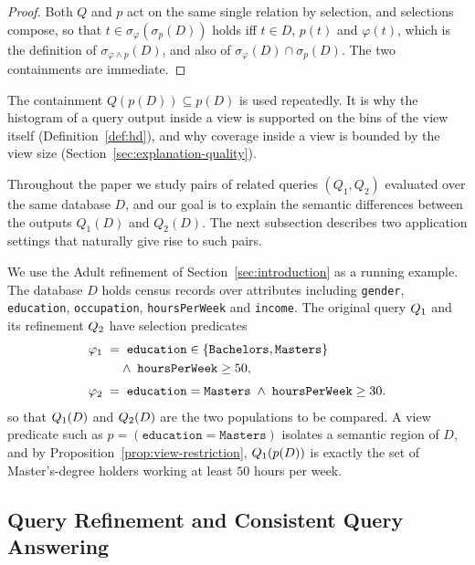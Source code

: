 \begin{proof}
Both $Q$ and $p$ act on the same single relation by selection, and selections
compose, so that $t\in\sigma_\varphi(\sigma_p(D))$ holds iff $t\in D$, $p(t)$ and $\varphi(t)$,
which is the definition of $\sigma_{\varphi\wedge p}(D)$, and also of
$\sigma_\varphi(D)\cap\sigma_p(D)$.
The two containments are immediate.
\end{proof}

The containment $Q(p(D))\subseteq p(D)$ is used repeatedly.
It is why the histogram
of a query output inside a view is supported on the bins of the view itself
(Definition~\ref{def:hd}), and why coverage inside a view is bounded by the view
size (Section~\ref{sec:explanation-quality}).

Throughout the paper we study pairs of related queries $(Q_1,Q_2)$ evaluated over
the same database $D$, and our goal is to explain the semantic differences between
the outputs $Q_1(D)$ and $Q_2(D)$.
The next subsection describes two application settings that naturally give rise to
such pairs.

\begin{example}
\label{ex:running}
We use the Adult refinement of Section~\ref{sec:introduction} as a running example.
The database $D$ holds census records over attributes including
\texttt{gender}, \texttt{education}, \texttt{occupation}, \texttt{hoursPerWeek} and
\texttt{income}.
The original query $Q_1$ and its refinement $Q_2$ have selection
predicates
\begin{align*}
\varphi_1 &\;=\; \texttt{education} \in \{\texttt{Bachelors},\texttt{Masters}\}\\
          &\hphantom{\;=\;} \wedge\; \texttt{hoursPerWeek} \ge 50 ,\\[3pt]
\varphi_2 &\;=\; \texttt{education} = \texttt{Masters}
              \;\wedge\; \texttt{hoursPerWeek} \ge 30 .
\end{align*}
so that $Q_1(D)$ and $Q_2(D)$ are the two populations to be compared.
A view predicate such as $p = (\texttt{education}=\texttt{Masters})$ isolates a
semantic region of $D$, and by Proposition~\ref{prop:view-restriction},
$Q_1(p(D))$ is exactly the set of Master's-degree holders working at least
$50$ hours per week.
\end{example}

\subsection{Query Refinement and Consistent Query Answering}
\label{subsec:prelim-settings}


